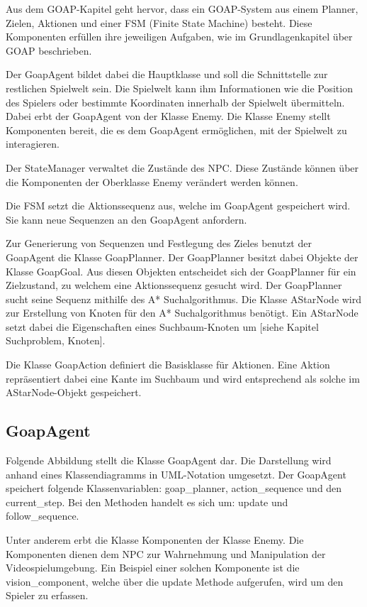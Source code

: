Aus dem GOAP-Kapitel geht hervor, dass ein GOAP-System aus einem Planner, Zielen, Aktionen und einer FSM (Finite State Machine) besteht. Diese Komponenten erfüllen ihre jeweiligen Aufgaben, wie im Grundlagenkapitel über GOAP beschrieben.

Der GoapAgent bildet dabei die Hauptklasse und soll die Schnittstelle zur restlichen Spielwelt sein. Die Spielwelt kann ihm Informationen wie die Position des Spielers oder bestimmte Koordinaten innerhalb der Spielwelt übermitteln. Dabei erbt der GoapAgent von der Klasse Enemy. Die Klasse Enemy stellt Komponenten bereit, die es dem GoapAgent ermöglichen, mit der Spielwelt zu interagieren.

Der StateManager verwaltet die Zustände des NPC. Diese Zustände können über die Komponenten der Oberklasse Enemy verändert werden können.

Die FSM setzt die Aktionssequenz aus, welche im GoapAgent gespeichert wird. Sie kann neue Sequenzen an den GoapAgent anfordern.

Zur Generierung von Sequenzen und Festlegung des Zieles benutzt der GoapAgent die Klasse GoapPlanner. Der GoapPlanner besitzt dabei Objekte der Klasse GoapGoal. Aus diesen Objekten entscheidet sich der GoapPlanner für ein Zielzustand, zu welchem eine Aktionssequenz gesucht wird.
Der GoapPlanner sucht seine Sequenz mithilfe des A* Suchalgorithmus. Die Klasse AStarNode wird zur Erstellung von Knoten für den A* Suchalgorithmus benötigt. Ein AStarNode setzt dabei die Eigenschaften eines Suchbaum-Knoten um [siehe Kapitel Suchproblem, Knoten].

Die Klasse GoapAction definiert die Basisklasse für Aktionen. Eine Aktion repräsentiert dabei eine Kante im Suchbaum und wird entsprechend als solche im AStarNode-Objekt gespeichert.



\subsection{GoapAgent}

Folgende Abbildung stellt die Klasse GoapAgent dar. Die Darstellung wird anhand eines Klassendiagramms in UML-Notation umgesetzt. Der GoapAgent speichert folgende Klassenvariablen: goap\_planner, action\_sequence und den current\_step. Bei den Methoden handelt es sich um: update und follow\_sequence. 

Unter anderem erbt die Klasse Komponenten der Klasse Enemy. Die Komponenten dienen dem NPC zur Wahrnehmung und Manipulation der Videospielumgebung. Ein Beispiel einer solchen Komponente ist die vision\_component, welche über die update Methode aufgerufen, wird um den Spieler zu erfassen.


